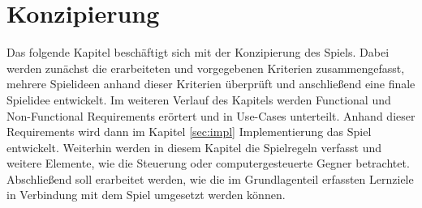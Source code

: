 \section{Konzipierung}
Das folgende Kapitel beschäftigt sich mit der Konzipierung des Spiels. Dabei werden zunächst die erarbeiteten und vorgegebenen Kriterien zusammengefasst, mehrere Spielideen anhand dieser Kriterien überprüft und anschließend eine finale Spielidee entwickelt. Im weiteren Verlauf des Kapitels werden Functional und Non-Functional Requirements erörtert und in Use-Cases unterteilt. Anhand dieser Requirements wird dann im Kapitel \ref{sec:impl} Implementierung das Spiel entwickelt. Weiterhin werden in diesem Kapitel die Spielregeln verfasst und weitere Elemente, wie die Steuerung oder computergesteuerte Gegner betrachtet. Abschließend soll erarbeitet werden, wie die im Grundlagenteil erfassten Lernziele in Verbindung mit dem Spiel umgesetzt werden können.
